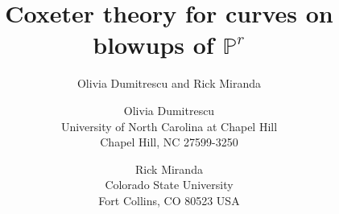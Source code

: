 \documentclass[12pt]{article}
\numberwithin{equation}{section}
\numberwithin{equation}{section}
\numberwithin{subeq}{equation}
\def\bbP{\mathbb{P}}
\begin{document}
\title{Coxeter theory for curves on blowups of $\bbP^r$}





\author{Olivia Dumitrescu and Rick Miranda}


\author{
	Olivia Dumitrescu  \\
	\small University of North Carolina at Chapel Hill \\ \small Chapel Hill, NC 27599-3250 \\
	\and
	Rick Miranda \\
	\small Colorado State University \\ \small Fort Collins, CO 80523 USA}

\maketitle
\end{document}
